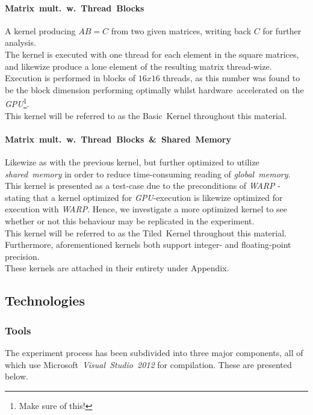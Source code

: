 \documentclass[fleqn,10pt]{SelfArx} %
\begin{document}
\paragraph{Matrix~mult.~w.~Thread~Blocks}
	A kernel producing $AB=C$ from two given matrices, writing back $C$ for further analysis.\\
	The kernel is executed with one thread for each element in the square matrices, and likewize produce a lone element of the resulting matrix thread-wize.\\
	Execution is performed in blocks of $16x16$ threads, as this number was found to be the block dimension performing optimally whilst hardware~accelerated on the \textit{GPU}\footnote{Make sure of this!}.  \\
	This kernel will be referred to as the Basic~Kernel throughout this material.
\paragraph{Matrix~mult.~w.~Thread~Blocks~\&~Shared~Memory}
	Likewize as with the previous kernel, but further optimized to utilize \textit{shared~memory} in order to reduce time-consuming reading of \textit{global~memory}\cite[p.~77-93]{Kirk:2010:PMP:1841511}.\\
	This kernel is presented as a test-case due to the preconditions of \textit{WARP} - stating that a kernel optimized for \textit{GPU}-execution is likewize optimized for execution with \textit{WARP}. Hence, we investigate a more optimized kernel to see whether or not this behaviour may be replicated in the experiment.\\
	This kernel will be referred to as the Tiled~Kernel throughout this material.\\

\noindent
Furthermore, aforementioned kernels both support integer- and floating-point precision.\\
These kernels are attached in their entirety under Appendix.

\subsection{Technologies}
\label{sec:contribution:technologies}
\subsubsection{Tools}
\label{sec:contribution:technologies}
The experiment process has been subdivided into three major components, all of which use Microsoft~\textit{Visual~Studio~2012} for compilation. These are presented below.
\end{document}
